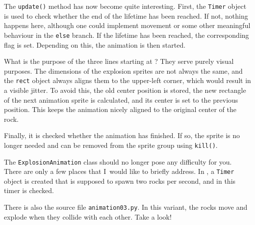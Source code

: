 The \texttt{update()} method has now become quite interesting. First, the \texttt{Timer} object is used to check whether the end of the lifetime has been reached. If not, nothing happens here, although one could implement movement or some other meaningful behaviour in the \texttt{else} branch. If the lifetime has been reached, the corresponding flag is set. Depending on this, the animation is then started.

What is the purpose of the three lines starting at ? They serve purely visual purposes. The dimensions of the explosion sprites are not always the same, and the \texttt{rect} object always aligns them to the upper-left corner, which would result in a visible jitter. To avoid this, the old center position is stored, the new rectangle of the next animation sprite is calculated, and its center is set to the previous position. This keeps the animation nicely aligned to the original center of the rock.

Finally, it is checked whether the animation has finished. If so, the sprite is no longer needed and can be removed from the sprite group using \texttt{kill()}.




The \texttt{ExplosionAnimation} class should no longer pose any difficulty for you. There are only a few places that I~would like to briefly address. In , a \texttt{Timer} object is created that is supposed to spawn two rocks per second, and in  this timer is checked.

\newpage
{} 

\begin{hintbox}[Hint]
	There is also the source file \texttt{animation03.py}. In this variant, the rocks move and explode when they collide with each other. Take a look!
\end{hintbox}


